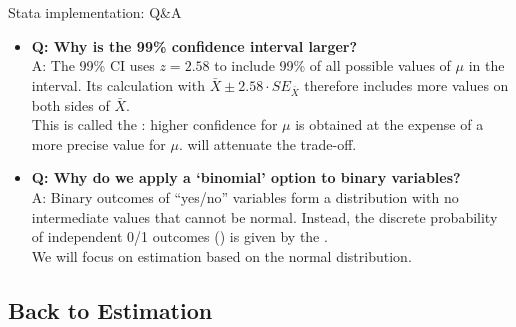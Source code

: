 \documentclass{beamer}
\begin{document}
	\begin{frame}[t]{Stata implementation: Q\&A}
			
	
	\begin{itemize}
		\item \textbf{Q: Why is the 99\% confidence interval larger?}\\[.25em]
		
		A: The 99\% CI uses $z = 2.58$ to include 99\% of all possible values of $\mu$ in the interval. Its calculation with $\bar X \pm 2.58 \cdot SE_{\bar X}$ therefore includes more values on both sides of $\bar X$.\\[.25em]
		
		This is called the : higher confidence for $\mu$ is obtained at the expense of a more precise value for $\mu$.  will attenuate the trade-off.\\[.25em]
		
		\item \textbf{Q: Why do we apply a `binomial' option to binary variables?}\\[.25em]
		
		A: Binary outcomes of ``yes/no'' variables form a distribution with no intermediate values that cannot be normal. Instead, the discrete probability of independent 0/1 outcomes () is given by the .\\[.25em]
		
		We will focus on estimation based on the normal distribution.
	\end{itemize}
		


	\end{frame}

	
	\subsection{Back to Estimation}
		
\end{document}
